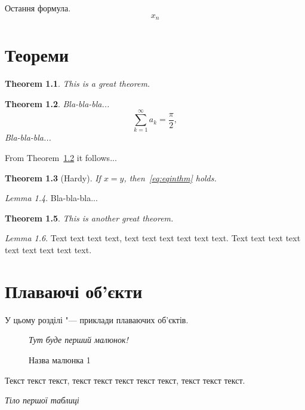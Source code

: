 \documentclass{report}
\theoremstyle{plain}
\newtheorem{theorem}{Theorem}[chapter]
\theoremstyle{remark}
\newtheorem{lemma}[theorem]{Lemma}%
\begin{document}
Остання формула.
\begin{equation}\label{eq:ch1last}
x_n
\end{equation}


\chapter{Теореми}

\begin{theorem}\label{thm:one}
This is a great theorem.
\end{theorem}

\begin{theorem}\label{thm:two}
Bla-bla-bla...
\begin{equation}\label{eq:eqinthm}
\sum_{k=1}^\infty a_k = \frac\pi2,
\end{equation}
Bla-bla-bla...
\end{theorem}

From Theorem~\ref{thm:two} it follows...

\begin{theorem}[Hardy]\label{thm:Hardy}
If $x=y$, then~\eqref{eq:eqinthm} holds.
\end{theorem}

\begin{lemma}\label{lem:aaa}
Bla-bla-bla...
\end{lemma}

\begin{theorem}\label{thm:five}
This is another great theorem.
\end{theorem}

\begin{lemma}\label{lem:bbb}
Text text text text, text text text text text text. Text text text text
text text text text text.
\end{lemma}


\chapter{Плаваючі об'єкти}

У цьому розділі "--- приклади плаваючих об'єктів.

\begin{figure}[htbp]
\emph{Тут буде перший малюнок!}
\caption{Назва малюнка 1}\label{fig:figure1}
\end{figure}

Текст текст текст, текст текст текст текст текст, текст текст текст.

\begin{table}[htbp]
\caption{Назва таблиці 1}\label{tab:table1}
\emph{Тіло першої таблиці}
\end{table}
\end{document}
